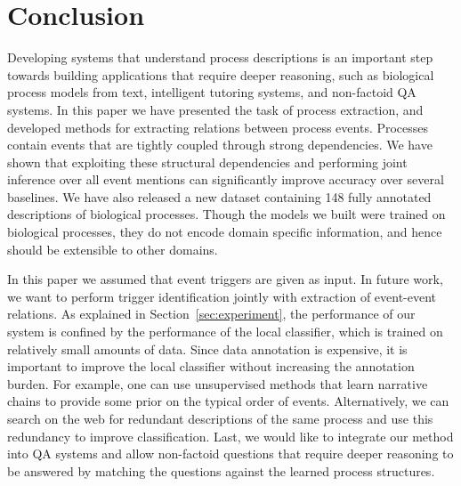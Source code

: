 \section{Conclusion}

Developing systems that understand process descriptions is an important step towards building applications that require deeper reasoning, such as biological process models from text, intelligent tutoring systems, and non-factoid QA systems. In this paper we have presented the task of process extraction, and developed methods for extracting relations between process events. Processes contain events that are  tightly coupled through strong dependencies. We have shown that  exploiting these structural dependencies and performing joint inference over all event mentions can significantly improve accuracy over several baselines. We have also released a new dataset containing 148 fully annotated descriptions of biological processes. Though the models we built were trained on biological processes, they do not encode domain specific information, and hence should be extensible to other domains.

In this paper we assumed that event triggers are given as input. In future work, we want to perform trigger identification jointly with extraction of event-event relations. As explained in Section~\ref{sec:experiment}, the performance of our system is confined by the performance of the local classifier, which is trained on relatively small amounts of data. Since data annotation is expensive, it is important to improve the local classifier without increasing the annotation burden. For example, one can use unsupervised methods that learn narrative chains \cite{Chambers11} to provide some prior on the typical order of events. Alternatively, we can search on the web for redundant descriptions of the same process and use this redundancy to improve classification. Last, we would like to integrate our method into QA systems and allow non-factoid questions that require deeper reasoning to be answered by matching the questions against the learned process structures.